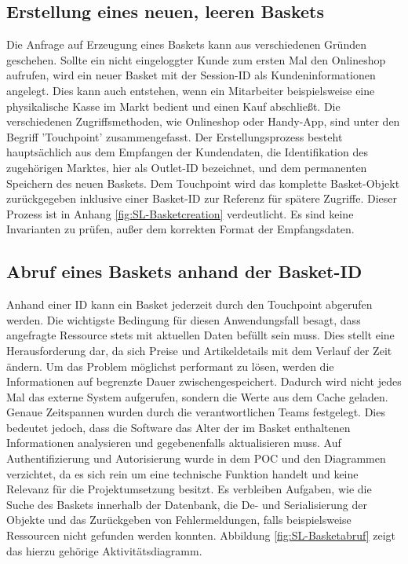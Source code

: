 \subsection{Erstellung eines neuen, leeren Baskets}

Die Anfrage auf Erzeugung eines Baskets kann aus verschiedenen Gründen geschehen. Sollte ein nicht eingeloggter Kunde zum ersten Mal den Onlineshop aufrufen, wird ein neuer Basket mit der Session-ID als Kundeninformationen angelegt. Dies kann auch entstehen, wenn ein Mitarbeiter beispielsweise eine physikalische Kasse im Markt bedient und einen Kauf abschließt. Die verschiedenen Zugriffsmethoden, wie Onlineshop oder Handy-App, sind unter den Begriff 'Touchpoint' zusammengefasst. Der Erstellungsprozess besteht hauptsächlich aus dem Empfangen der Kundendaten, die Identifikation des zugehörigen Marktes, hier als Outlet-ID bezeichnet, und dem permanenten Speichern des neuen Baskets. Dem Touchpoint wird das komplette Basket-Objekt zurückgegeben inklusive einer Basket-ID zur Referenz für spätere Zugriffe. Dieser Prozess ist in Anhang \ref{fig:SL-Basketcreation} verdeutlicht. Es sind keine Invarianten zu prüfen, außer dem korrekten Format der Empfangsdaten.

\subsection{Abruf eines Baskets anhand der Basket-ID}

Anhand einer ID kann ein Basket jederzeit durch den Touchpoint abgerufen werden. Die wichtigste Bedingung für diesen Anwendungsfall besagt, dass angefragte Ressource stets mit aktuellen Daten befüllt sein muss. Dies stellt eine Herausforderung dar, da sich Preise und Artikeldetails mit dem Verlauf der Zeit ändern. Um das Problem möglichst performant zu lösen, werden die Informationen auf begrenzte Dauer zwischengespeichert. Dadurch wird nicht jedes Mal das externe System aufgerufen, sondern die Werte aus dem Cache geladen. Genaue Zeitspannen wurden durch die verantwortlichen Teams festgelegt. Dies bedeutet jedoch, dass die Software das Alter der im Basket enthaltenen Informationen analysieren und gegebenenfalls aktualisieren muss. Auf Authentifizierung und Autorisierung wurde in dem POC und den Diagrammen verzichtet, da es sich rein um eine technische Funktion handelt und keine Relevanz für die Projektumsetzung besitzt. Es verbleiben Aufgaben, wie die Suche des Baskets innerhalb der Datenbank, die De- und Serialisierung der Objekte und das Zurückgeben von Fehlermeldungen, falls beispielsweise Ressourcen nicht gefunden werden konnten. Abbildung \ref{fig:SL-Basketabruf} zeigt das hierzu gehörige Aktivitätsdiagramm.

